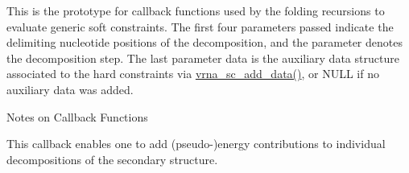 This is the prototype for callback functions used by the folding recursions to evaluate generic soft constraints. The first four parameters passed indicate the delimiting nucleotide positions of the decomposition, and the parameter {\ttfamily denotes} the decomposition step. The last parameter {\ttfamily data} is the auxiliary data structure associated to the hard constraints via \mbox{\hyperlink{group__soft__constraints_ga15c6d52471ec97897e2bb7f964f5deb6}{vrna\+\_\+sc\+\_\+add\+\_\+data()}}, or N\+U\+LL if no auxiliary data was added.

\begin{DoxyRefDesc}{Notes on Callback Functions}
\item[\mbox{\hyperlink{callbacks__callbacks000002}{Notes on Callback Functions}}]This callback enables one to add (pseudo-\/)energy contributions to individual decompositions of the secondary structure. \end{DoxyRefDesc}


